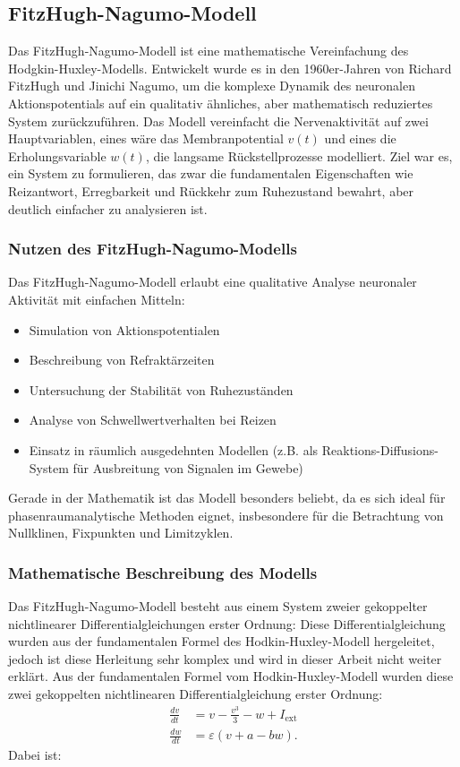 \begin{refsection}
\section{FitzHugh-Nagumo-Modell}
Das FitzHugh-Nagumo-Modell ist eine mathematische Vereinfachung des Hodgkin-Huxley-Modells. Entwickelt wurde es in den 1960er-Jahren von Richard FitzHugh und Jinichi Nagumo, um die komplexe Dynamik des neuronalen Aktionspotentials auf ein qualitativ ähnliches, aber mathematisch reduziertes System zurückzuführen.
Das Modell vereinfacht die Nervenaktivität auf zwei Hauptvariablen, eines wäre das Membranpotential $v(t)$ und eines die Erholungsvariable $w(t)$, die langsame Rückstellprozesse modelliert.
Ziel war es, ein System zu formulieren, das zwar die fundamentalen Eigenschaften wie Reizantwort, Erregbarkeit und Rückkehr zum Ruhezustand bewahrt, aber deutlich einfacher zu analysieren ist. 
\cite{nerven:InaLammers.31.08.2015}
\subsubsection{Nutzen des FitzHugh-Nagumo-Modells}
Das FitzHugh-Nagumo-Modell erlaubt eine qualitative Analyse neuronaler Aktivität mit einfachen Mitteln:
\begin{itemize}
    \item Simulation von Aktionspotentialen
    \item Beschreibung von Refraktärzeiten
    \item Untersuchung der Stabilität von Ruhezuständen
    \item Analyse von Schwellwertverhalten bei Reizen
    \item Einsatz in räumlich ausgedehnten Modellen (z.B. als Reaktions-Diffusions-System für Ausbreitung von Signalen im Gewebe)
\end{itemize}

Gerade in der Mathematik ist das Modell besonders beliebt, da es sich ideal für phasenraumanalytische Methoden eignet,
insbesondere für die Betrachtung von Nullklinen, Fixpunkten und Limitzyklen.
\cite{nerven:InaLammers.31.08.2015}
\subsubsection{Mathematische Beschreibung des Modells}
Das FitzHugh-Nagumo-Modell besteht aus einem System zweier gekoppelter nichtlinearer Differentialgleichungen erster Ordnung:
Diese Differentialgleichung wurden aus der fundamentalen Formel des Hodkin-Huxley-Modell hergeleitet, jedoch ist diese Herleitung sehr komplex und wird in dieser Arbeit nicht weiter erklärt. Aus der fundamentalen Formel vom Hodkin-Huxley-Modell wurden diese zwei gekoppelten nichtlinearen Differentialgleichung erster Ordnung:
\[
\begin{aligned}
	\frac{dv}{dt} &= v - \frac{v^3}{3} - w + I_{\text{ext}} \\
	\frac{dw}{dt} &= \varepsilon (v + a - b w).
\end{aligned}
\]
\cite{nerven:InaLammers.31.08.2015}
\noindent
Dabei ist:


\end{refsection}
